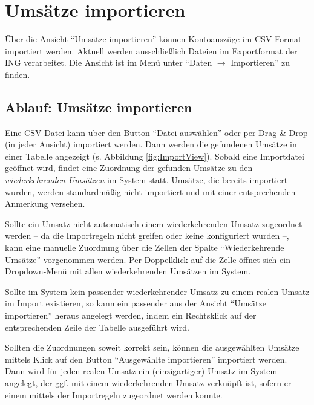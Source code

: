 \chapter{Umsätze importieren} \label{chap:import}

Über die Ansicht "`Umsätze importieren"' können Kontoauszüge im CSV-Format importiert werden. Aktuell werden ausschließlich Dateien im Exportformat der ING verarbeitet. Die Ansicht ist im Menü unter "`Daten $\rightarrow$ Importieren"' zu finden.

\section{Ablauf: Umsätze importieren}

Eine CSV-Datei kann über den Button "`Datei auswählen"' oder per Drag \& Drop (in jeder Ansicht) importiert werden. Dann werden die gefundenen Umsätze in einer Tabelle angezeigt (s. Abbildung \ref{fig:ImportView}). Sobald eine Importdatei geöffnet wird, findet eine Zuordnung der gefunden Umsätze zu den \textit{wiederkehrenden Umsätzen} im System statt. Umsätze, die bereits importiert wurden, werden standardmäßig nicht importiert und mit einer entsprechenden Anmerkung versehen.

Sollte ein Umsatz nicht automatisch einem wiederkehrenden Umsatz zugeordnet werden -- da die Importregeln nicht greifen oder keine konfiguriert wurden --, kann eine manuelle Zuordnung über die Zellen der Spalte "`Wiederkehrende Umsätze"' vorgenommen werden. Per Doppelklick auf die Zelle öffnet sich ein Dropdown-Menü mit allen wiederkehrenden Umsätzen im System.

Sollte im System kein passender wiederkehrender Umsatz zu einem realen Umsatz im Import existieren, so kann ein passender aus der Ansicht "`Umsätze importieren"' heraus angelegt werden, indem ein Rechtsklick auf der entsprechenden Zeile der Tabelle ausgeführt wird. 

Sollten die Zuordnungen soweit korrekt sein, können die ausgewählten Umsätze mittels Klick auf den Button "`Ausgewählte importieren"' importiert werden. Dann wird für jeden realen Umsatz ein (einzigartiger) Umsatz im System angelegt, der ggf. mit einem wiederkehrenden Umsatz verknüpft ist, sofern er einem mittels der Importregeln zugeordnet werden konnte.


